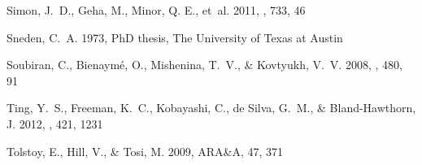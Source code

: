 \documentclass{emulateapj}
\begin{document}
\begin{thebibliography}{40}
{Simon}, J.~D., {Geha}, M., {Minor}, Q. E., {et~al.} 2011, \apj, 733, 46

{Sneden}, C.~A. 1973, PhD thesis, The University of Texas at Austin

{Soubiran}, C., {Bienaym{\'e}}, O., {Mishenina}, T.~V., \& {Kovtyukh}, V.~V.
  2008, \aap, 480, 91

{Ting}, Y.~S., {Freeman}, K.~C., {Kobayashi}, C., {de Silva}, G.~M., \& {Bland-Hawthorn}, J.
 2012, \mnras, 421, 1231

{Tolstoy}, E., {Hill}, V., \& {Tosi}, M. 2009, ARA\&A, 47, 371


\end{thebibliography}
\end{document}

